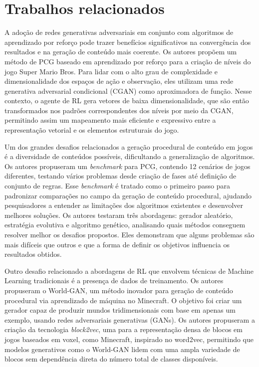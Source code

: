 \chapter{Trabalhos relacionados}

A adoção de redes generativas adversariais em conjunto com algoritmos de aprendizado por reforço 
pode trazer benefícios significativos na convergência dos resultados e na geração de conteúdo mais coerente. 
Os autores  propõem um método de PCG baseado em aprendizado por reforço para a criação 
de níveis do jogo Super Mario Bros. Para lidar com o alto grau de complexidade e dimensionalidade dos espaços de 
ação e observação, eles utilizam uma rede generativa adversarial condicional (CGAN) como aproximadora de função. 
Nesse contexto, o agente de RL gera vetores de baixa dimensionalidade, que são então transformados nos padrões 
correspondentes dos níveis por meio da CGAN, permitindo assim um mapeamento mais eficiente e expressivo entre a 
representação vetorial e os elementos estruturais do jogo.

Um dos grandes desafios relacionados a geração procedural de conteúdo em jogos
é a diversidade de conteúdos possíveis, dificultando a generalização de 
algoritmos. Os autores 
propuseram um \textit{benchmark} para PCG, contendo 12 cenários de jogos diferentes,
testando vários problemas desde criação de fases até definição de conjunto de regras.
Esse \textit{benchmark} é tratado como o primeiro passo para padronizar comparações no campo da geração de conteúdo procedural, 
ajudando pesquisadores a entender as limitações dos algoritmos existentes e desenvolver melhores soluções.
Os autores testaram três abordagens: gerador aleatório, estratégia evolutiva e algoritmo genético, 
analisando quais métodos conseguem resolver melhor os desafios propostos. Eles demonstram 
que alguns problemas são mais difíceis que outros e que a forma de definir os objetivos influencia os resultados obtidos.


Outro desafio relacionado a abordagens de RL que envolvem técnicas de Machine Learning tradicionais é a presença
de dados de treinamento. Os autores  propuseram o World-GAN, 
um método inovador para geração de conteúdo procedural via aprendizado de máquina no Minecraft. 
O objetivo foi criar um gerador capaz de produzir mundos tridimensionais com base em apenas um exemplo, 
usando redes adversariais generativas (GANs). Os autores propuseram a criação da tecnologia \textit{block2vec}, 
uma para a representação densa de blocos em jogos baseados em voxel, como Minecraft, inspirado no word2vec, 
permitindo que modelos generativos como o World-GAN lidem com uma ampla variedade de blocos sem 
dependência direta do número total de classes disponíveis.


